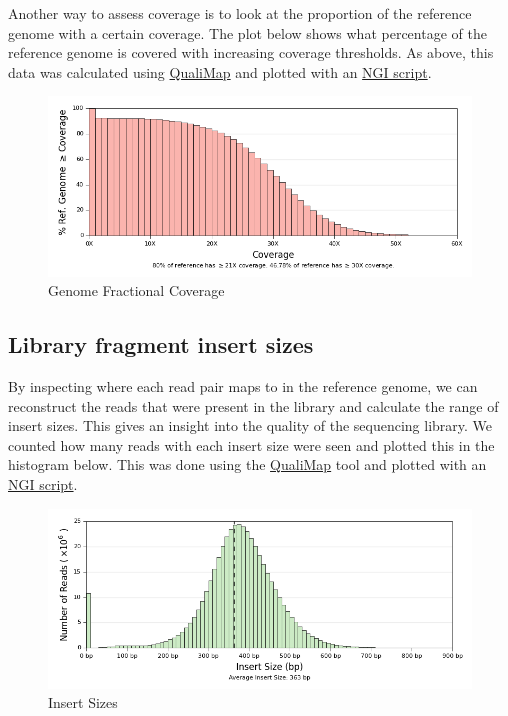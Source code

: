 \documentclass[]{article}
\begin{document}
Another way to assess coverage is to look at the proportion of the
reference genome with a certain coverage. The plot below shows what
percentage of the reference genome is covered with increasing coverage
thresholds. As above, this data was calculated using
\href{http://qualimap.bioinfo.cipf.es/}{QualiMap} and plotted with an
\href{https://github.com/SciLifeLab/visualizations}{NGI script}.

\begin{figure}[htbp]
\centering
\includegraphics{plots/genome_fraction.png}
\caption{Genome Fractional Coverage}
\end{figure}

\subsection{Library fragment insert
sizes}\label{library-fragment-insert-sizes}

By inspecting where each read pair maps to in the reference genome, we
can reconstruct the reads that were present in the library and calculate
the range of insert sizes. This gives an insight into the quality of the
sequencing library. We counted how many reads with each insert size were
seen and plotted this in the histogram below. This was done using the
\href{http://qualimap.bioinfo.cipf.es/}{QualiMap} tool and plotted with
an \href{https://github.com/SciLifeLab/visualizations}{NGI script}.

\begin{figure}[htbp]
\centering
\includegraphics{plots/qualimap_insertsize.png}
\caption{Insert Sizes}
\end{figure}
\end{document}
